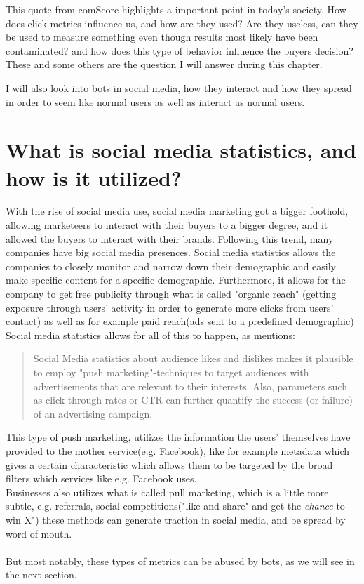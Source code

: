 This quote from comScore highlights a important point in today's society. How does click metrics influence us, and how are they used? Are they useless, can they be used to measure something even though results most likely have been contaminated? and how does this type of behavior influence the buyers decision? These and some others are the question I will answer during this chapter. 

I will also look into bots in social media, how they interact and how they spread in order to seem like normal users as well as interact as normal users. 
\section{What is  social media statistics, and how is it utilized?}
With the rise of social media use, social media marketing got a bigger foothold, allowing marketeers to interact with their buyers to a bigger degree, and it allowed the buyers to interact with their brands. Following this trend, many companies have big social media presences. Social media statistics allows the companies to closely monitor and narrow down their demographic and easily make specific content for a specific demographic. Furthermore, it allows for the company to get free publicity through what is called "organic reach" (getting exposure through users' activity in order to generate more clicks from users' contact) as well as for example paid reach(ads sent to a predefined demographic)
Social media statistics allows for all of this to happen, as \cite{Singh2013} mentions:
\begin{quotation}
Social Media statistics about audience likes and dislikes makes it plausible to employ "push marketing"-techniques to target audiences with advertisements that are relevant to their interests. Also, parameters such as click through rates or CTR can further quantify the success (or failure) of an advertising campaign. 
\end{quotation}
This type of push marketing, utilizes the information the users' themselves have provided to the mother service(e.g. Facebook), like for example metadata which gives a certain characteristic which allows them to be targeted by the broad filters which services like e.g. Facebook uses. 
\\
Businesses also utilizes what is called pull marketing, which is a little more subtle, e.g. referrals, social competitions("like and share" and get the \textit{chance} to win X") these methods can generate traction in social media, and be spread by word of mouth. 
\\
\\
But most notably, these types of metrics can be abused by bots, as we will see in the next section. 

